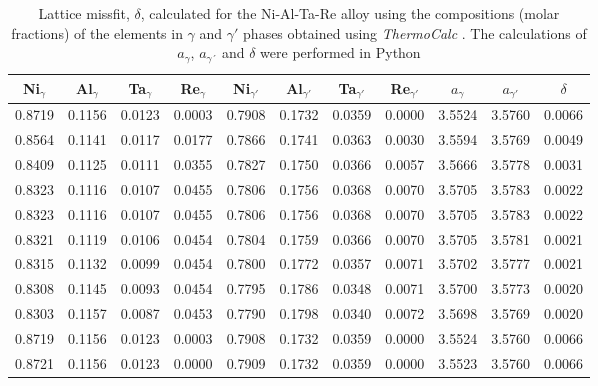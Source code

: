 \begin{table}[H]
    \centering
    \begin{tabular}{rrrrrrrrrrr}
        \multicolumn{1}{c}{Ni$_\gamma$} & \multicolumn{1}{c}{Al$_\gamma$} & \multicolumn{1}{c}{Ta$_\gamma$} & \multicolumn{1}{c}{Re$_\gamma$} & \multicolumn{1}{c}{Ni$_{\gamma'}$} & \multicolumn{1}{c}{Al$_{\gamma'}$} & \multicolumn{1}{c}{Ta$_{\gamma'}$} & \multicolumn{1}{c}{Re$_{\gamma'}$} & \multicolumn{1}{c}{$a_\gamma$} & \multicolumn{1}{c}{$a_{\gamma'}$} & \multicolumn{1}{c}{$\delta$} \\ \hline \hline
        0.8719 & 0.1156 & 0.0123 & 0.0003 & 0.7908 & 0.1732 & 0.0359 & 0.0000 & 3.5524 & 3.5760 & 0.0066 \\0.8564 & 0.1141 & 0.0117 & 0.0177 & 0.7866 & 0.1741 & 0.0363 & 0.0030 & 3.5594 & 3.5769 & 0.0049 \\0.8409 & 0.1125 & 0.0111 & 0.0355 & 0.7827 & 0.1750 & 0.0366 & 0.0057 & 3.5666 & 3.5778 & 0.0031 \\0.8323 & 0.1116 & 0.0107 & 0.0455 & 0.7806 & 0.1756 & 0.0368 & 0.0070 & 3.5705 & 3.5783 & 0.0022 \\0.8323 & 0.1116 & 0.0107 & 0.0455 & 0.7806 & 0.1756 & 0.0368 & 0.0070 & 3.5705 & 3.5783 & 0.0022 \\0.8321 & 0.1119 & 0.0106 & 0.0454 & 0.7804 & 0.1759 & 0.0366 & 0.0070 & 3.5705 & 3.5781 & 0.0021 \\0.8315 & 0.1132 & 0.0099 & 0.0454 & 0.7800 & 0.1772 & 0.0357 & 0.0071 & 3.5702 & 3.5777 & 0.0021 \\0.8308 & 0.1145 & 0.0093 & 0.0454 & 0.7795 & 0.1786 & 0.0348 & 0.0071 & 3.5700 & 3.5773 & 0.0020 \\0.8303 & 0.1157 & 0.0087 & 0.0453 & 0.7790 & 0.1798 & 0.0340 & 0.0072 & 3.5698 & 3.5769 & 0.0020 \\0.8719 & 0.1156 & 0.0123 & 0.0003 & 0.7908 & 0.1732 & 0.0359 & 0.0000 & 3.5524 & 3.5760 & 0.0066 \\0.8721 & 0.1156 & 0.0123 & 0.0000 & 0.7909 & 0.1732 & 0.0359 & 0.0000 & 3.5523 & 3.5760 & 0.0066
    \end{tabular}
    \caption{Lattice missfit, $\delta$, calculated for the Ni-Al-Ta-Re alloy using the compositions (molar fractions) of the elements in $\gamma$ and $\gamma'$ phases obtained using \textit{ThermoCalc} \citep{thermocalc}. The calculations of $a_\gamma$, $a_{\gamma´}$ and $\delta$ were performed in Python \citep{mygit}}
    \label{tab:tab06}
\end{table}


